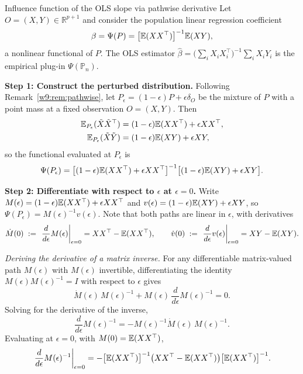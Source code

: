 \documentclass[master.tex]{subfiles}
\begin{document}
\begin{example}{Influence function of the OLS slope via pathwise derivative}
\label{w9:ex:if-ols}
Let $O = (X, Y) \in \mathbb{R}^{p+1}$ and consider the population
linear regression coefficient
\[
  \beta = \Psi(P)
  =
  \bigl[\mathbb{E}(XX^\top)\bigr]^{-1}\mathbb{E}(XY),
\]
a nonlinear functional of $P$.  The OLS estimator
$\hat\beta = \bigl(\sum_i X_iX_i^\top\bigr)^{-1}\sum_i X_iY_i$ is
the empirical plug-in $\Psi(\mathbb{P}_n)$.

\medskip\noindent\textbf{Step 1: Construct the perturbed distribution.}
Following Remark~\ref{w9:rem:pathwise}, let
$P_\epsilon = (1-\epsilon)P + \epsilon\delta_O$ be the mixture of $P$
with a point mass at a fixed observation $O = (X, Y)$.  Then
\begin{align*}
  \mathbb{E}_{P_\epsilon}(\tilde X \tilde X^\top)
  &= (1-\epsilon)\mathbb{E}(XX^\top) + \epsilon XX^\top, \\
  \mathbb{E}_{P_\epsilon}(\tilde X \tilde Y)
  &= (1-\epsilon)\mathbb{E}(XY) + \epsilon XY,
\end{align*}
so the functional evaluated at $P_\epsilon$ is
\[
  \Psi(P_\epsilon)
  =
  \bigl[(1-\epsilon)\mathbb{E}(XX^\top) + \epsilon XX^\top\bigr]^{-1}
  \bigl[(1-\epsilon)\mathbb{E}(XY) + \epsilon XY\bigr].
\]

\medskip\noindent\textbf{Step 2: Differentiate with respect to
$\epsilon$ at $\epsilon = 0$.}
Write $M(\epsilon) = (1-\epsilon)\mathbb{E}(XX^\top) + \epsilon XX^\top$ and
$v(\epsilon) = (1-\epsilon)\mathbb{E}(XY) + \epsilon XY$, so
$\Psi(P_\epsilon) = M(\epsilon)^{-1}v(\epsilon)$.  Note that both
paths are linear in $\epsilon$, with derivatives
\[
  \dot M(0)
  \;:=\;
  \left.\frac{d}{d\epsilon}M(\epsilon)\right|_{\epsilon=0}
  = XX^\top - \mathbb{E}(XX^\top),
  \qquad
  \dot v(0)
  \;:=\;
  \left.\frac{d}{d\epsilon}v(\epsilon)\right|_{\epsilon=0}
  = XY - \mathbb{E}(XY).
\]

\medskip\noindent\textit{Deriving the derivative of a matrix inverse.}
For any differentiable matrix-valued path $M(\epsilon)$ with $M(\epsilon)$
invertible, differentiating the identity
$M(\epsilon)M(\epsilon)^{-1} = I$ with respect to $\epsilon$ gives
\[
  \dot M(\epsilon)\,M(\epsilon)^{-1}
  + M(\epsilon)\,\frac{d}{d\epsilon}M(\epsilon)^{-1}
  = 0.
\]
Solving for the derivative of the inverse,
\[
  \frac{d}{d\epsilon}M(\epsilon)^{-1}
  =
  -M(\epsilon)^{-1}\dot M(\epsilon)\,M(\epsilon)^{-1}.
\]
Evaluating at $\epsilon = 0$, with $M(0) = \mathbb{E}(XX^\top)$,
\[
  \left.\frac{d}{d\epsilon}M(\epsilon)^{-1}\right|_{\epsilon=0}
  =
  -\bigl[\mathbb{E}(XX^\top)\bigr]^{-1}
  \bigl(XX^\top - \mathbb{E}(XX^\top)\bigr)
  \bigl[\mathbb{E}(XX^\top)\bigr]^{-1}.
\]


\end{example}
\end{document}
